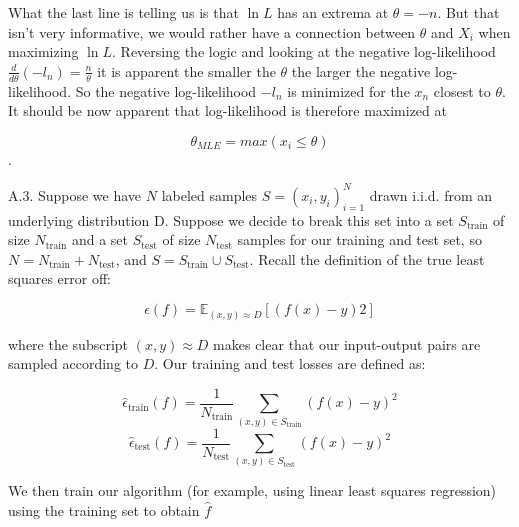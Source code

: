 \documentclass{article}
\newcommand{\1}{\mathbf{1}}
\newcommand{\E}{\mathbb{E}}
\begin{document}
What the last line is telling us is that $\ln L$ has an extrema at $\theta=-n$. But that isn't very informative, we would rather have a connection between $\theta$ and $X_i$ when maximizing $\ln L$. Reversing the logic and looking at the negative log-likelihood $\frac{d}{d\theta}(-l_n)  = \frac{n}{\theta}$ it is apparent the smaller the $\theta$ the larger the negative log-likelihood. So the negative log-likelihood $-l_n$ is minimized for the $x_n$ closest to $\theta$. It should be now apparent that log-likelihood is therefore maximized at 

$$\theta_{MLE}=max(x_i \leq \theta)$$. 


\newpage
A.3.  Suppose we have $N$ labeled samples $S={(x_i,y_i)}^N_{i=1}$ drawn i.i.d. from an underlying distribution D. Suppose we decide to break this set into a set $S_\text{train}$ of size $N_\text{train}$ and a set $S_\text{test}$ of size $N_\text{test}$ samples for our training and test set, so $N = N_{\text{train}} + N_{\text{test}}$, and $S = S_{\text{train}} \cup S_{\text{test}}$.  Recall the definition of the true least squares error off:

$$\epsilon(f) = \E_{(x,y)\approx D}[(f(x)-y)2]$$

where the subscript $(x,y)\approx D$ makes clear that our input-output pairs are sampled according to $D$. Our training and test losses are defined as: 

$$\widehat\epsilon_{\text{train}}(f) = \frac{1}{N_\text{train}}\sum_{(x,y)\in S_\text{train}}(f(x)-y)^2$$
$$\widehat\epsilon_{\text{test}}(f) = \frac{1}{N_\text{test}}\sum_{(x,y)\in S_\text{test}}(f(x)-y)^2$$

We then train our algorithm (for example, using linear least squares regression) using the training set to obtain $\hat f$
\end{document}
